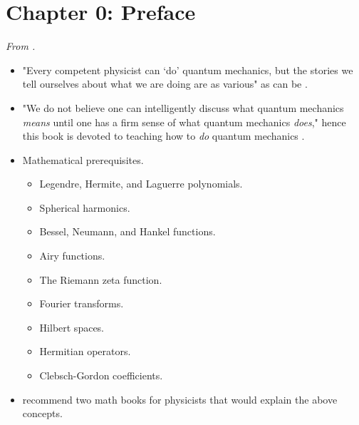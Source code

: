 \documentclass[../notes.tex]{subfiles}
\begin{document}
\section{Chapter 0: Preface}
\emph{From \textcite{bib:Griffiths}.}
\begin{itemize}
    \item {}"Every competent physicist can `do' quantum mechanics, but the stories we tell ourselves about what we are doing are as various" as can be \parencite[11]{bib:Griffiths}.
    \item "We do not believe one can intelligently discuss what quantum mechanics \emph{means} until one has a firm sense of what quantum mechanics \emph{does}," hence this book is devoted to teaching how to \emph{do} quantum mechanics \parencite[11]{bib:Griffiths}.
    \item Mathematical prerequisites.
    \begin{itemize}
        \item Legendre, Hermite, and Laguerre polynomials.
        \item Spherical harmonics.
        \item Bessel, Neumann, and Hankel functions.
        \item Airy functions.
        \item The Riemann zeta function.
        \item Fourier transforms.
        \item Hilbert spaces.
        \item Hermitian operators.
        \item Clebsch-Gordon coefficients.
    \end{itemize}
    \item \textcite{bib:Griffiths} recommend two math books for physicists that would explain the above concepts.
\end{itemize}
\end{document}
